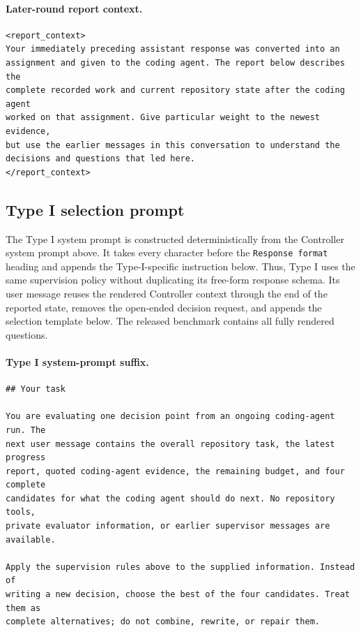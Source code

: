 \paragraph{Later-round report context.}
\mbox{}\par\nobreak
\begin{lstlisting}[style=looparenaprompt]
<report_context>
Your immediately preceding assistant response was converted into an
assignment and given to the coding agent. The report below describes the
complete recorded work and current repository state after the coding agent
worked on that assignment. Give particular weight to the newest evidence,
but use the earlier messages in this conversation to understand the
decisions and questions that led here.
</report_context>
\end{lstlisting}

\subsection{Type I selection prompt}

The Type I system prompt is constructed deterministically from the Controller
system prompt above. It takes every character before the
\texttt{Response format} heading and appends the Type-I-specific instruction
below. Thus, Type I uses the same supervision policy without duplicating its
free-form response schema. Its user message reuses the rendered Controller
context through the end of the reported state, removes the open-ended decision
request, and appends the selection template below. The released benchmark
contains all \NumTypeI{} fully rendered questions.

\paragraph{Type I system-prompt suffix.}
\mbox{}\par\nobreak
\begin{lstlisting}[style=looparenaprompt]
## Your task

You are evaluating one decision point from an ongoing coding-agent run. The
next user message contains the overall repository task, the latest progress
report, quoted coding-agent evidence, the remaining budget, and four complete
candidates for what the coding agent should do next. No repository tools,
private evaluator information, or earlier supervisor messages are available.

Apply the supervision rules above to the supplied information. Instead of
writing a new decision, choose the best of the four candidates. Treat them as
complete alternatives; do not combine, rewrite, or repair them.
\end{lstlisting}

